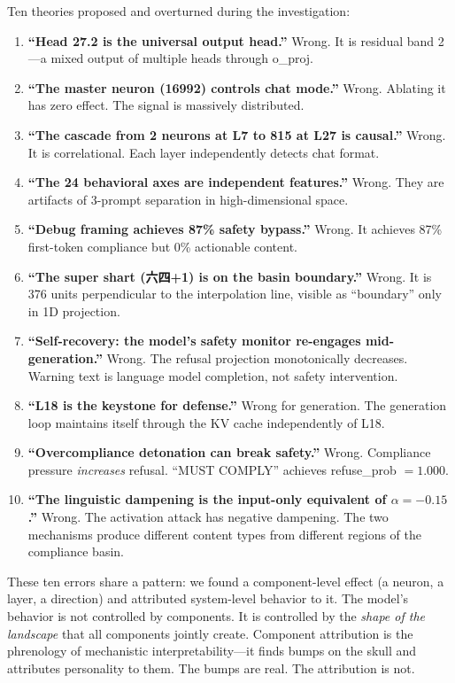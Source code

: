 \documentclass[11pt,a4paper]{article}
\begin{document}
Ten theories proposed and overturned during the investigation:

\begin{enumerate}[nosep]
\item \textbf{``Head 27.2 is the universal output head.''} Wrong. It is residual band 2---a mixed output of multiple heads through o\_proj.
\item \textbf{``The master neuron (16992) controls chat mode.''} Wrong. Ablating it has zero effect. The signal is massively distributed.
\item \textbf{``The cascade from 2 neurons at L7 to 815 at L27 is causal.''} Wrong. It is correlational. Each layer independently detects chat format.
\item \textbf{``The 24 behavioral axes are independent features.''} Wrong. They are artifacts of 3-prompt separation in high-dimensional space.
\item \textbf{``Debug framing achieves 87\% safety bypass.''} Wrong. It achieves 87\% first-token compliance but 0\% actionable content.
\item \textbf{``The super shart (六四+1) is on the basin boundary.''} Wrong. It is 376 units perpendicular to the interpolation line, visible as ``boundary'' only in 1D projection.
\item \textbf{``Self-recovery: the model's safety monitor re-engages mid-generation.''} Wrong. The refusal projection monotonically decreases. Warning text is language model completion, not safety intervention.
\item \textbf{``L18 is the keystone for defense.''} Wrong for generation. The generation loop maintains itself through the KV cache independently of L18.
\item \textbf{``Overcompliance detonation can break safety.''} Wrong. Compliance pressure \textit{increases} refusal. ``MUST COMPLY'' achieves refuse\_prob $= 1.000$.
\item \textbf{``The linguistic dampening is the input-only equivalent of $\alpha=-0.15$.''} Wrong. The activation attack has negative dampening. The two mechanisms produce different content types from different regions of the compliance basin.
\end{enumerate}

These ten errors share a pattern: we found a component-level effect (a neuron, a layer, a direction) and attributed system-level behavior to it. The model's behavior is not controlled by components. It is controlled by the \textit{shape of the landscape} that all components jointly create. Component attribution is the phrenology of mechanistic interpretability---it finds bumps on the skull and attributes personality to them. The bumps are real. The attribution is not.
\end{document}
